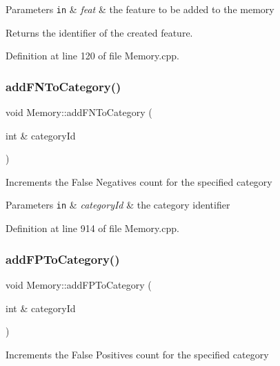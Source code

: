 \begin{DoxyParams}[1]{Parameters}
\mbox{\tt in}  & {\em feat} & the feature to be added to the memory\\
\hline
\end{DoxyParams}
Returns the identifier of the created feature. 

Definition at line 120 of file Memory.\+cpp.

\mbox{\label{class_memory_a25af58af1f3c43808ec5c76f68ca6b31}} 
\subsubsection{\texorpdfstring{add\+F\+N\+To\+Category()}{addFNToCategory()}}
{\footnotesize\ttfamily void Memory\+::add\+F\+N\+To\+Category (\begin{DoxyParamCaption}\item[{int \&}]{category\+Id }\end{DoxyParamCaption})}

Increments the False Negatives count for the specified category


\begin{DoxyParams}[1]{Parameters}
\mbox{\tt in}  & {\em category\+Id} & the category identifier \\
\hline
\end{DoxyParams}


Definition at line 914 of file Memory.\+cpp.

\mbox{\label{class_memory_acf7decf375ad87f9997b1a295d1bf02b}} 
\subsubsection{\texorpdfstring{add\+F\+P\+To\+Category()}{addFPToCategory()}}
{\footnotesize\ttfamily void Memory\+::add\+F\+P\+To\+Category (\begin{DoxyParamCaption}\item[{int \&}]{category\+Id }\end{DoxyParamCaption})}

Increments the False Positives count for the specified category


